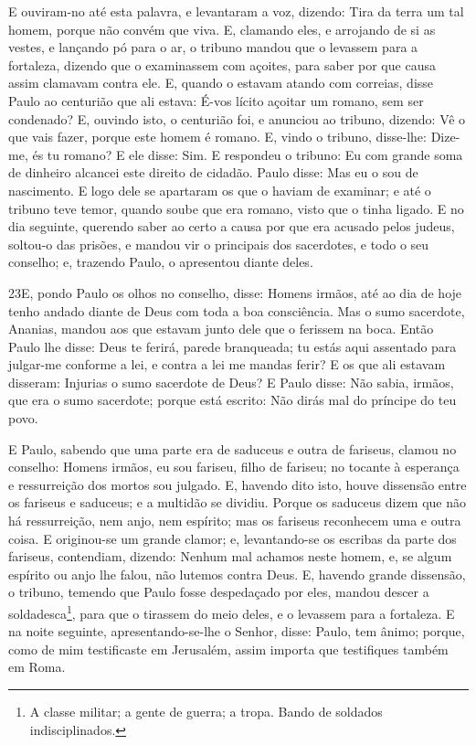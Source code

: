 E ouviram-no até esta palavra, e levantaram a voz, dizendo: Tira
da terra um tal homem, porque não convém que viva. E,
clamando eles, e arrojando de si as vestes, e lançando pó para o ar,
o tribuno mandou que o levassem para a fortaleza, dizendo que
o examinassem com açoites, para saber por que causa assim clamavam
contra ele. E, quando o estavam atando com correias, disse
Paulo ao centurião que ali estava: É-vos lícito açoitar um romano,
sem ser condenado? E, ouvindo isto, o centurião foi, e
anunciou ao tribuno, dizendo: Vê o que vais fazer, porque este homem
é romano. E, vindo o tribuno, disse-lhe: Dize-me, és tu
romano? E ele disse: Sim. E respondeu o tribuno: Eu com
grande soma de dinheiro alcancei este direito de cidadão. Paulo
disse: Mas eu o sou de nascimento. E logo dele se apartaram
os que o haviam de examinar; e até o tribuno teve temor, quando
soube que era romano, visto que o tinha ligado. E no dia
seguinte, querendo saber ao certo a causa por que era acusado pelos
judeus, soltou-o das prisões, e mandou vir o principais dos
sacerdotes, e todo o seu conselho; e, trazendo Paulo, o apresentou
diante deles.

\medskip

\lettrine{23} E, pondo Paulo os olhos no conselho, disse:
Homens irmãos, até ao dia de hoje tenho andado diante de Deus com
toda a boa consciência. Mas o sumo sacerdote, Ananias, mandou
aos que estavam junto dele que o ferissem na boca. Então Paulo
lhe disse: Deus te ferirá, parede branqueada; tu estás aqui
assentado para julgar-me conforme a lei, e contra a lei me mandas
ferir? E os que ali estavam disseram: Injurias o sumo sacerdote
de Deus? E Paulo disse: Não sabia, irmãos, que era o sumo
sacerdote; porque está escrito: Não dirás mal do príncipe do teu
povo.

E Paulo, sabendo que uma parte era de saduceus e outra de
fariseus, clamou no conselho: Homens irmãos, eu sou fariseu, filho
de fariseu; no tocante à esperança e ressurreição dos mortos sou
julgado. E, havendo dito isto, houve dissensão entre os fariseus
e saduceus; e a multidão se dividiu. Porque os saduceus dizem
que não há ressurreição, nem anjo, nem espírito; mas os fariseus
reconhecem uma e outra coisa. E originou-se um grande clamor; e,
levantando-se os escribas da parte dos fariseus, contendiam,
dizendo: Nenhum mal achamos neste homem, e, se algum espírito ou
anjo lhe falou, não lutemos contra Deus. E, havendo grande
dissensão, o tribuno, temendo que Paulo fosse despedaçado por eles,
mandou descer a soldadesca\footnote{A classe militar; a gente de
guerra; a tropa. Bando de soldados indisciplinados.}, para que o
tirassem do meio deles, e o levassem para a fortaleza. E na
noite seguinte, apresentando-se-lhe o Senhor, disse: Paulo, tem
ânimo; porque, como de mim testificaste em Jerusalém, assim importa
que testifiques também em Roma.

